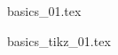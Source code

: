 \documentclass[a4paper,12pt, openany]{book}
\begin{document}
       {basics_01.tex}

       {basics_tikz_01.tex}
\end{document}
